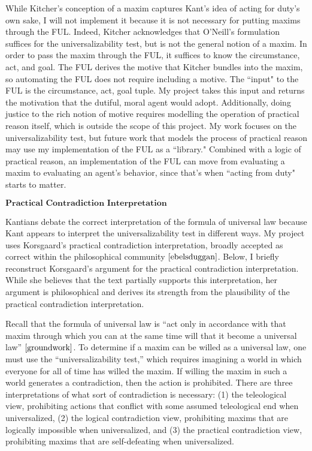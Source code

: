 \begin{isabellebody}
\begin{isamarkuptext}
While Kitcher's conception of a maxim captures Kant's idea of acting for duty's own sake, I will not implement it 
because it is not necessary for putting maxims through the FUL. Indeed, Kitcher acknowledges that 
O'Neill's formulation suffices for the universalizability test, but is not the general notion of a maxim.
In order to pass the maxim through the FUL, it suffices to know the circumstance, act, and goal. The FUL
derives the motive that Kitcher bundles into the maxim, so automating the FUL does not require 
including a motive. The ``input" to the FUL is the circumstance, act, goal tuple. My project takes 
this input and returns the motivation that the dutiful, moral agent would adopt. Additionally, doing
justice to the rich notion of motive requires modelling the operation of practical reason itself, 
which is outside the scope of this project. My work focuses on the universalizability test, but future work that 
models the process of practical reason may use my implementation of the FUL as a ``library." Combined 
with a logic of practical reason, an implementation of the FUL can move from evaluating a maxim to 
evaluating an agent's behavior, since that's when ``acting from duty" starts to matter.

$\textbf{Practical Contradiction Interpretation}$

Kantians debate the correct interpretation of the formula of universal law because Kant appears to 
interpret the universalizability test in different ways. My project uses Korsgaard's practical contradiction 
interpretation, broadly accepted as correct within the philosophical community $\cite[177]{ebelsduggan}$.
Below, I briefly reconstruct Korsgaard's argument for the practical contradiction interpretation. While 
she believes that the text partially supports this interpretation, her argument is philosophical and 
derives its strength from the plausibility of the practical contradiction interpretation.

Recall that the formula of universal law is “act only in accordance with that maxim through which you can at the 
same time will that it become a universal law” $\cite[4:421]{groundwork}$. To determine if a maxim can be willed as a 
universal law, one must use the “universalizability test,” which requires imagining a world in which 
everyone for all of time has willed the maxim. If willing the maxim in such a world generates a contradiction, 
then the action is prohibited. There are three interpretations of what sort of contradiction is necessary: 
(1) the teleological view, prohibiting actions that conflict with some assumed teleological end when 
universalized, (2) the logical contradiction view, prohibiting maxims that are logically impossible 
when universalized, and (3) the practical contradiction view, prohibiting maxims that are self-defeating 
when universalized.


\end{isamarkuptext}
\end{isabellebody}
